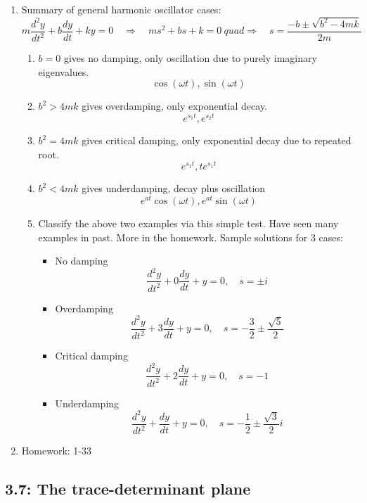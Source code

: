 \documentclass{article}
\begin{document}
\begin{enumerate}
\item Summary of general harmonic oscillator cases:
\[
m \frac{d^2 y}{dt^2} + b \frac{dy}{dt} + k y =0 \quad \Rightarrow \quad ms^2 + bs + k = 0 \ quad \Rightarrow \quad s = \frac{-b \pm \sqrt{b^2-4mk}}{2m}
\]
\begin{enumerate}
\item $b = 0$ gives no damping, only oscillation due to purely imaginary eigenvalues.
\[
\cos(\omega t), \sin(\omega t)
\]
\item $b^2>4mk$ gives overdamping, only exponential decay.
\[
e^{s_1 t}, e^{s_2 t}
\]
\item $b^2=4mk$ gives critical damping, only exponential decay due to repeated root.
\[
e^{s_1 t}, te^{s_1 t}
\]
\item $b^2<4mk$ gives underdamping, decay plus oscillation
\[
e^{at} \cos(\omega t), e^{at} \sin(\omega t)
\]
\item Classify the above two examples via this simple test. Have seen many examples in past. More in the homework. Sample solutions for 3 cases:
\begin{itemize}
\item No damping
\[
\frac{d^2y}{dt^2} + 0 \frac{dy}{dt} + y = 0, \quad s=\pm i
\]
\item Overdamping
\[
\frac{d^2y}{dt^2} + 3 \frac{dy}{dt} + y = 0, \quad s=-\frac{3}{2} \pm \frac{\sqrt{5}}{2} 
\]
\item Critical damping
\[
\frac{d^2y}{dt^2} + 2 \frac{dy}{dt} + y = 0, \quad s=-1
\]
\item Underdamping
\[
\frac{d^2y}{dt^2} + \frac{dy}{dt} + y = 0, \quad s=-\frac{1}{2} \pm \frac{\sqrt{3}}{2} i
\]
\end{itemize}
\end{enumerate}

\item Homework: 1-33

\end{enumerate}

\subsection{3.7: The trace-determinant plane}
\end{document}
